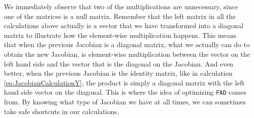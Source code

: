 We immediately observe that two of the multiplications are unnecessary, since one of the matrices is a null matrix. Remember that the left matrix in all the calculations above actually is a vector that we have transformed into a diagonal matrix to illustrate how the element-wise multiplication happens. This means that when the previous Jacobian is a diagonal matrix, what we actually can do to obtain the new Jacobian, is element-wise multiplication between the vector on the left hand side and the vector that is the diagonal on the Jacobian. And even better, when the previous Jacobian is the identity matrix, like in calculation \eqref{eq:JacobianCalculationY}, the product is simply a diagonal matrix with the left hand side vector on the diagonal. This is where the idea of optimizing \texttt{FAD} comes from. By knowing what type of Jacobian we have at all times, we can sometimes take safe shortcuts in our calculations. 

